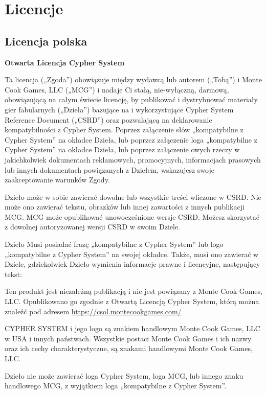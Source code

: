 \chapter{Licencje}

\section{Licencja polska}

\textbf{Otwarta Licencja Cypher System}

Ta licencja („Zgoda”) obowiązuje między wydawcą lub autorem („Tobą”) i Monte Cook Games, LLC („MCG”) i nadaje Ci stałą, nie-wyłączną, darmową, obowiązującą na całym świecie licencję, by publikować i dystrybuować materiały gier fabularnych („Dzieła”) bazujące na i wykorzystujące Cypher System Reference Document („CSRD”) oraz pozwalającą na deklarowanie kompatybilności z Cypher System. Poprzez załączenie słów „kompatybilne z Cypher System” na okładce Dzieła, lub poprzez załączenie loga „kompatybilne z Cypher System” na okładce Dzieła, lub poprzez załączenie owych rzeczy w jakichkolwiek dokumentach reklamowych, promocyjnych, informacjach prasowych lub innych dokumentach powiązanych z Dziełem, wskazujesz swoje zaakceptowanie warunków Zgody.

Dzieło może w sobie zawierać dowolne lub wszystkie treści wliczone w CSRD. Nie może ono zawierać tekstu, obrazków lub innej zawartości z innych publikacji MCG. MCG może opublikować unowocześnione wersje CSRD. Możesz skorzystać z dowolnej autoryzowanej wersji CSRD w swoim Dziele.

Dzieło Musi posiadać frazę „kompatybilne z Cypher System” lub logo „kompatybilne z Cypher System” na swojej okładce. Także, musi ono zawierać w Dziele, gdziekolwiek Dzieło wymienia informacje prawne i licencyjne, następujący tekst:

\begin{displayquote}
Ten produkt jest niezależną publikacją i nie jest powiązany z Monte Cook Games, LLC. Opublikowano go zgodnie z Otwartą Licencją Cypher System, którą można znaleźć pod adresem \url{https://csol.montecookgames.com/}

CYPHER SYSTEM i jego logo są znakiem handlowym Monte Cook Games, LLC w USA i innych państwach. Wszystkie postaci Monte Cook Games i ich nazwy oraz ich cechy charakterystyczne, są znakami handlowymi Monte Cook Games, LLC.
\end{displayquote}

Dzieło nie może zawierać loga Cypher System, loga MCG, lub innego znaku handlowego MCG, z wyjątkiem loga „kompatybilne z Cypher System”.

